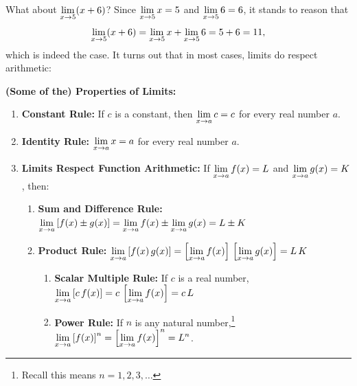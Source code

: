 \documentclass{ximera}
\begin{document}
\medskip

What about $\ds{\lim_{x \rightarrow 5}  (x+6)}$?  Since $\ds{\lim_{x \rightarrow 5} x = 5}$ and $\ds{ \lim_{x \rightarrow 5} 6 = 6}$, it stands to reason that \[\ds{\lim_{x \rightarrow 5}  (x+6) = \lim_{x \rightarrow 5} x  + \lim_{x \rightarrow 5} 6 = 5 + 6 = 11,}\] which is indeed the case.  It turns out that in most cases, limits do respect arithmetic:
\medskip

\colorbox{ResultColor}{\bbm

\begin{thm}  \label{LimitProp01}  \textbf{(Some of the) Properties of Limits:}

\begin{enumerate}

\item  \textbf{Constant Rule:} If $c$ is a constant, then $\ds{ \lim_{x \rightarrow a} c = c}$ for every real number $a$.

\item \textbf{Identity Rule:} $\ds{ \lim_{x \rightarrow a} x = a}$ for every real number $a$.

\item  \textbf{Limits Respect Function Arithmetic:}  If $\ds{ \lim_{x \rightarrow a} f(x) = L}$ and $\ds{ \lim_{x \rightarrow a} g(x) = K}$, then:

\begin{enumerate}

\item \textbf{Sum and Difference Rule:}  $\ds{\lim_{x \rightarrow a} \left[f(x)\pm g(x)\right] =
\lim_{x \rightarrow a} f(x) \pm \lim_{x \rightarrow a} g(x) = L
\pm K}$

\item \textbf{Product Rule:}  $\ds{\lim_{x \rightarrow a} \left[f(x) \, g(x)\right] =
\left[\lim_{x \rightarrow a} f(x)\right] \, \left[ \lim_{x
\rightarrow a} g(x)\right] = L \, K}$

\begin{enumerate}

\item \textbf{Scalar Multiple Rule:}  If $c$ is a real number, $\ds{\lim_{x \rightarrow a} \left[c \, f(x)\right] =
c \, \left[\lim_{x \rightarrow a} f(x)\right] =c \, L}$


\item \textbf{Power Rule:}  If   $n$ is any
natural number,\footnote{Recall this means  $n = 1,2,3,\ldots$}
$\ds{\lim_{x \rightarrow a} \left[f(x)\right]^{n} = \left[
\lim_{x \rightarrow a} f(x) \right]^{n}= L^{n}}$.
\end{enumerate}


\end{enumerate}
\end{enumerate}
\end{thm}}
\end{document}
